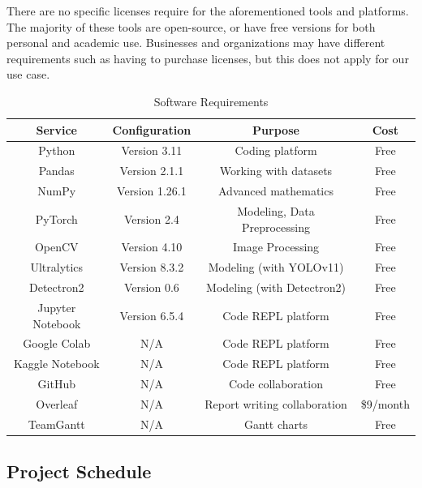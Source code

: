 \documentclass[stu,12pt,floatsintext]{apa7}
\begin{document}
There are no specific licenses require for the aforementioned tools and platforms. The majority of these tools are open-source, or have free versions for both personal and academic use. Businesses and organizations may have different requirements such as having to purchase licenses, but this does not apply for our use case.

\begin{table}[!htb]
	\centering
	\caption{Software Requirements}
	\begin{tabular}{cccc}
		\hline
		Service          & Configuration  & Purpose                      & Cost      \\
		\hline
		Python           & Version 3.11   & Coding platform              & Free      \\
		Pandas           & Version 2.1.1  & Working with datasets        & Free      \\
		NumPy            & Version 1.26.1 & Advanced mathematics         & Free      \\
		PyTorch          & Version 2.4    & Modeling, Data Preprocessing & Free      \\
		OpenCV           & Version 4.10   & Image Processing             & Free      \\
		Ultralytics      & Version 8.3.2  & Modeling (with YOLOv11)       & Free      \\
		Detectron2       & Version 0.6    & Modeling (with Detectron2)   & Free      \\
		Jupyter Notebook & Version 6.5.4  & Code REPL platform           & Free      \\
		Google Colab     & N/A            & Code REPL platform           & Free      \\
		Kaggle Notebook  & N/A            & Code REPL platform           & Free      \\
		GitHub           & N/A            & Code collaboration           & Free      \\
		Overleaf         & N/A            & Report writing collaboration & \$9/month \\
		TeamGantt        & N/A            & Gantt charts                 & Free      \\
		\hline
	\end{tabular}
	\label{tab:software}
\end{table}

\subsection{Project Schedule}
\end{document}
